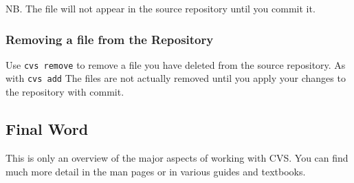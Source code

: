 NB.  The file will not appear in the source repository until you
      commit it.

\subsubsection{Removing a file from the Repository}
Use {\tt cvs remove} to remove a file you have deleted from the 
    source repository.  
As with {\tt cvs add} The files are not actually removed until
    you apply your changes  to  the repository with commit.  

\subsection{Final Word}
This is only an overview of the major aspects of working with CVS.
        You can find much more detail in the man pages or in various
        guides and textbooks.